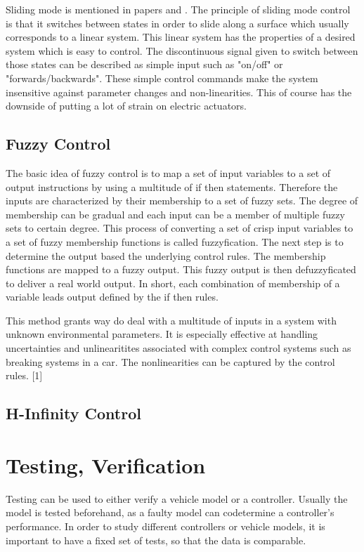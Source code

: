 \documentclass[conference]{IEEEtran}
\begin{document}
Sliding mode is mentioned in papers \cite{Weidong} and \cite{Aoki}. The principle of sliding mode control is that it switches between states in order to slide along a surface which usually corresponds to a linear system. This linear system has the properties of a desired system which is easy to control. The discontinuous signal given to switch between those states can be described as simple input such as "on/off" or "forwards/backwards". These simple control commands make the system insensitive against parameter changes and non-linearities. This of course has the downside of  putting a lot of strain on electric actuators.  	

\subsection{Fuzzy Control}
The basic idea of fuzzy control is to map a set of input variables to a set of output instructions by using a multitude of if then statements. Therefore the inputs are characterized by their membership to a set of fuzzy sets. The degree of membership can be gradual and each input can be a member of multiple fuzzy sets to certain degree. This process of converting a set of crisp input variables to a set of fuzzy membership functions is called fuzzyfication. The next step is to determine the output based the underlying control rules. The membership functions are mapped to a fuzzy output. This fuzzy output is then defuzzyficated to deliver a real world output. In short, each combination of membership of a variable leads output defined by the if then rules.

This method grants way do deal with a multitude of inputs in a system with unknown environmental parameters. It is especially effective at handling uncertainties and unlinearitites associated with complex control systems such as breaking systems in a car. The nonlinearities can be captured by the control rules.
[1]
\subsection{H-Infinity Control}

\section{Testing, Verification}

Testing can be used to either verify a vehicle model or a controller. Usually the model is tested beforehand, as a faulty model can codetermine a controller's performance. 
In order to study different controllers or vehicle models, it is important to have a fixed set of tests, so that the data is comparable.
\end{document}

